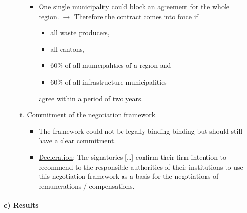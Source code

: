 \begin{itemize}
\begin{enumerate}[i.]
                \begin{itemize}
                    \item One single municipality could block an agreement for the
                        whole region. $\rightarrow$ Therefore the contract comes
                        into force if
                        \begin{itemize}
                            \item all waste producers,
                            \item all cantons,
                            \item $60\%$ of all municipalities of a region and
                            \item $60\%$ of all infrastructure municipalities
                        \end{itemize}
                        agree within a period of two years.
                \end{itemize}
            \item Commitment of the negotiation framework
                \begin{itemize}
                    \item The framework could not be legally binding binding
                        but should still have a clear commitment.
                    \item \underline{Decleration}: The signatories [\dots]
                        confirm their firm intention to recommend to the
                        responsible authorities of their institutions to use
                        this negotiation framework as a basis for the negotiations
                        of remunerations / compensations.
                \end{itemize}
        \end{enumerate}
\end{itemize}


\paragraph{c) Results}

